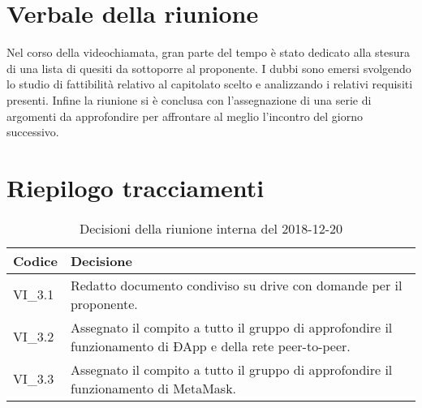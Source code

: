 \section{Verbale della riunione}
Nel corso della videochiamata, gran parte del tempo è stato dedicato alla 
stesura di una lista di quesiti da sottoporre al proponente. I dubbi sono emersi
svolgendo lo studio di fattibilità relativo al capitolato\glo{} scelto e 
analizzando i
relativi requisiti presenti.
Infine la riunione si è conclusa con l'assegnazione di una serie di argomenti 
da approfondire per affrontare al meglio l'incontro del giorno 
successivo.
\pagebreak
\section{Riepilogo tracciamenti}

	\begin{longtable}{ >{\centering}p{} >{}p{}}
		\caption{Decisioni della riunione interna del 2018-12-20}\\	
		\rowcolorhead
		\textbf{\color{white}Codice} 
		& \centering\textbf{\color{white}Decisione} 
		\tabularnewline 
		\endfirsthead
		VI\_3.1 & Redatto documento condiviso su drive con domande per il 
		proponente.
	
		\tabularnewline 
		VI\_3.2 & Assegnato il compito a tutto il gruppo di approfondire il 
		funzionamento
					di ÐApp\glo{} e della rete peer-to-peer\glo{}.
		
		\tabularnewline
		VI\_3.3 & Assegnato il compito a tutto il gruppo di approfondire il 
		funzionamento
					di MetaMask\glo{}.
					
	
	\end{longtable}


